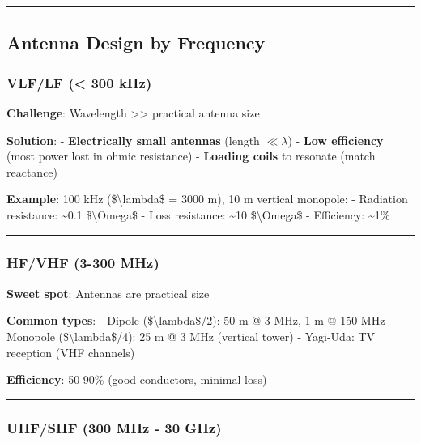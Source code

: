 \begin{center}\rule{0.5\linewidth}{0.5pt}\end{center}

\subsection{Antenna Design by
Frequency}\label{antenna-design-by-frequency}

\subsubsection{VLF/LF (\textless{} 300 kHz)}\label{vlflf-300-khz}

\textbf{Challenge}: Wavelength \textgreater\textgreater{} practical
antenna size

\textbf{Solution}: - \textbf{Electrically small antennas} (length
\(\ll \lambda\)) - \textbf{Low efficiency} (most power lost in ohmic
resistance) - \textbf{Loading coils} to resonate (match reactance)

\textbf{Example}: 100 kHz (\$\textbackslash lambda\$ = 3000 m), 10 m
vertical monopole: - Radiation resistance: \textasciitilde0.1
\$\textbackslash Omega\$ - Loss resistance: \textasciitilde10
\$\textbackslash Omega\$ - Efficiency: \textasciitilde1\%

\begin{center}\rule{0.5\linewidth}{0.5pt}\end{center}

\subsubsection{HF/VHF (3-300 MHz)}\label{hfvhf-3-300-mhz}

\textbf{Sweet spot}: Antennas are practical size

\textbf{Common types}: - Dipole (\$\textbackslash lambda\$/2): 50 m @ 3
MHz, 1 m @ 150 MHz - Monopole (\$\textbackslash lambda\$/4): 25 m @ 3
MHz (vertical tower) - Yagi-Uda: TV reception (VHF channels)

\textbf{Efficiency}: 50-90\% (good conductors, minimal loss)

\begin{center}\rule{0.5\linewidth}{0.5pt}\end{center}

\subsubsection{UHF/SHF (300 MHz - 30
GHz)}\label{uhfshf-300-mhz---30-ghz}

